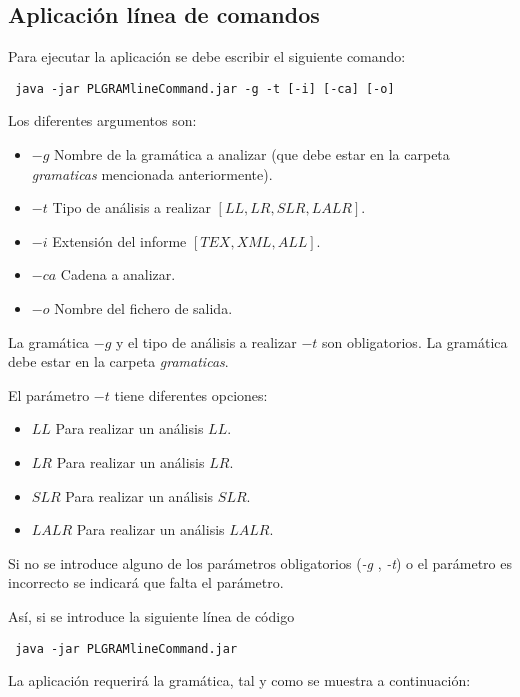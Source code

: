 \subsection{Aplicación línea de comandos}

Para ejecutar la aplicación se debe escribir el siguiente comando:
\begin{verbatim}
 java -jar PLGRAMlineCommand.jar -g -t [-i] [-ca] [-o] 
\end{verbatim}

 
 Los diferentes argumentos son:
 \begin{itemize}
 	\item $-g$ Nombre de la gramática a analizar (que debe estar en la carpeta \textit{gramaticas} mencionada anteriormente).
 	\item $-t$ Tipo de análisis a realizar $[LL,LR,SLR,LALR].$
 	\item $-i$ Extensión del informe $[TEX, XML, ALL]$.
 	\item $-ca$ Cadena a analizar.
 	\item $-o$ Nombre del fichero de salida.
 	
\end{itemize} 



La gramática $-g$ y el tipo de análisis a realizar $-t$ son obligatorios. La gramática debe estar en la carpeta \textit{gramaticas}.
 
El parámetro $-t$ tiene diferentes opciones:
  \begin{itemize}
 	 \item $LL$ Para realizar un análisis $LL$.
 	 \item $LR$ Para realizar un análisis $LR$.
 	 \item $SLR$ Para realizar un análisis $SLR$.
 	 \item $LALR$ Para realizar un análisis $LALR$.
 \end{itemize}
  
 
Si no se introduce alguno de los parámetros obligatorios (\textit{-g} , \textit{-t}) o el parámetro es incorrecto se indicará que falta el parámetro.
 
Así, si se introduce la siguiente línea de código 
\begin{verbatim}
 java -jar PLGRAMlineCommand.jar  
\end{verbatim}

La aplicación requerirá la gramática, tal y como se muestra a continuación:


